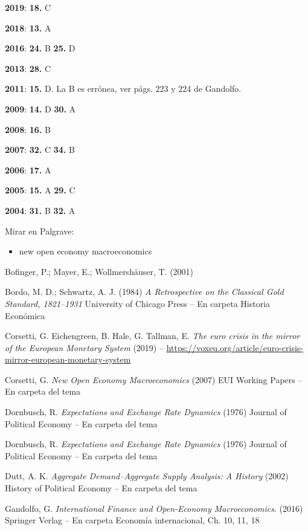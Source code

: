 \documentclass{nuevotema}
\begin{document}
\notas

\textbf{2019}: \textbf{18.} C

\textbf{2018}: \textbf{13.} A

\textbf{2016}: \textbf{24.} B \textbf{25.} D

\textbf{2013}: \textbf{28.} C

\textbf{2011}: \textbf{15.} D. La B es errónea, ver págs. 223 y 224 de Gandolfo.

\textbf{2009}: \textbf{14.} D \textbf{30.} A

\textbf{2008}: \textbf{16.} B

\textbf{2007}: \textbf{32.} C \textbf{34.} B

\textbf{2006}: \textbf{17.} A

\textbf{2005}: \textbf{15.} A \textbf{29.} C

\textbf{2004}: \textbf{31.} B \textbf{32.} A

\bibliografia

Mirar en Palgrave:
\begin{itemize}
	\item new open economy macroeconomics
\end{itemize}

Bofinger, P.; Mayer, E.; Wollmershäuser, T. (2001)

Bordo, M. D.; Schwartz, A. J. (1984) \textit{A Retrospective on the Classical Gold Standard, 1821--1931} University of Chicago Press -- En carpeta Historia Económica

Corsetti, G. Eichengreen, B. Hale, G. Tallman, E. \textit{The euro crisis in the mirror of the European Monetary System} (2019) -- \url{https://voxeu.org/article/euro-crisis-mirror-european-monetary-system}

Corsetti, G. \textit{New Open Economy Macroeconomics} (2007) EUI Working Papers -- En carpeta del tema

Dornbusch, R. \textit{Expectations and Exchange Rate Dynamics} (1976) Journal of Political Economy -- En carpeta del tema

Dornbusch, R. \textit{Expectations and Exchange Rate Dynamics} (1976) Journal of Political Economy -- En carpeta del tema

Dutt, A. K. \textit{Aggregate Demand–Aggregate Supply Analysis: A History} (2002) History of Political Economy -- En carpeta del tema

Gandolfo, G. \textit{International Finance and Open-Economy Macroeconomics}. (2016) Springer Verlag -- En carpeta Economía internacional, Ch. 10, 11, 18
\end{document}
